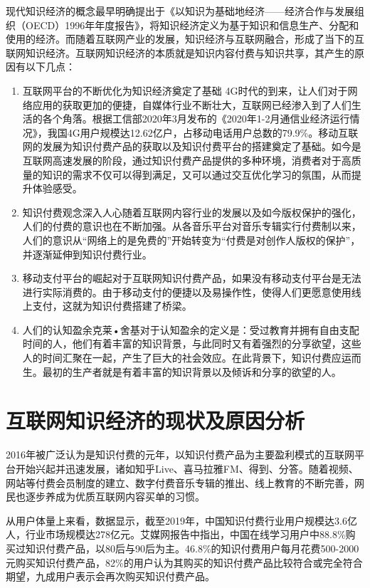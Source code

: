 \documentclass[UTF8,a4paper,12pt]{ctexart}  %
\providecommand{\tightlist}{\setlength{\itemsep}{0pt}\setlength{\parskip}{0pt}}
\begin{document}
现代知识经济的概念最早明确提出于《以知识为基础地经济------经济合作与发展组织（OECD）1996年年度报告》，将知识经济定义为基于知识和信息生产、分配和使用的经济。而随着互联网产业的发展，知识经济与互联网融合，形成了当下的互联网知识经济。互联网知识经济的本质就是知识内容付费与知识共享，其产生的原因有以下几点：

\begin{enumerate}
\def\labelenumi{\arabic{enumi}.}
\tightlist
\item
  互联网平台的不断优化为知识经济奠定了基础
  4G时代的到来，让人们对于网络应用的获取更加的便捷，自媒体行业不断壮大，互联网已经渗入到了人们生活的各个角落。根据工信部2020年3月发布的《2020年1-2月通信业经济运行情况》，我国4G用户规模达12.62亿户，占移动电话用户总数的79.9\%。移动互联网的发展为知识付费产品的获取以及知识付费平台的搭建奠定了基础。如今是互联网高速发展的阶段，通过知识付费产品提供的多种环境，消费者对于高质量的知识的需求不仅可以得到满足，又可以通过交互优化学习的氛围，从而提升体验感受。
\item
  知识付费观念深入人心随着互联网内容行业的发展以及如今版权保护的强化，人们的付费的意识也在不断加强。从各音乐平台对音乐专辑实行付费制以来，人们的意识从``网络上的是免费的''开始转变为``付费是对创作人版权的保护''，并逐渐延伸到知识付费行业。
\item
  移动支付平台的崛起对于互联网知识付费产品，如果没有移动支付平台是无法进行实际消费的。由于移动支付的便捷以及易操作性，使得人们更愿意使用线上支付，这就为知识付费搭建了桥梁。
\item
  人们的认知盈余克莱•舍基对于认知盈余的定义是：受过教育并拥有自由支配时间的人，他们有着丰富的知识背景，与此同时又有着强烈的分享欲望，这些人的时间汇聚在一起，产生了巨大的社会效应。在此背景下，知识付费应运而生。最初的生产者就是有着丰富的知识背景以及倾诉和分享的欲望的人。
\end{enumerate}

\hypertarget{section-2}{%
\section{互联网知识经济的现状及原因分析}\label{section-2}}

2016年被广泛认为是知识付费的元年，以知识付费产品为主要盈利模式的互联网平台开始兴起并迅速发展，诸如知乎Live、喜马拉雅FM、得到、分答。随着视频、网站等付费会员制度的建立、数字付费音乐专辑的推出、线上教育的不断完善，网民也逐步养成为优质互联网内容买单的习惯。

从用户体量上来看，数据显示，截至2019年，中国知识付费行业用户规模达3.6亿人，行业市场规模达278亿元。艾媒网报告中指出，中国在线学习用户中88.8\%购买过知识付费产品，以80后与90后为主。46.8\%的知识付费用户每月花费500-2000元购买知识付费产品，82\%的用户认为其购买的知识付费产品比较符合或完全符合期望，九成用户表示会再次购买知识付费产品。
\end{document}
